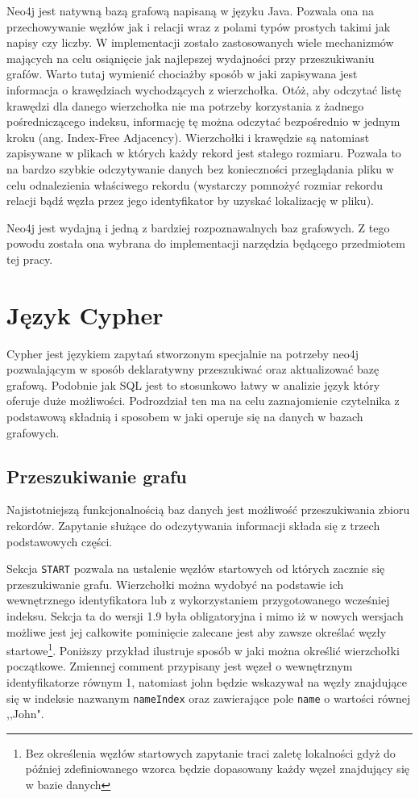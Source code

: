 \documentclass[brudnopis]{xmgr}
\begin{document}
Neo4j jest natywną bazą grafową napisaną w języku Java. Pozwala ona na przechowywanie węzłów jak i relacji wraz z polami typów prostych takimi jak napisy czy liczby. W implementacji zostało zastosowanych wiele mechanizmów mających na celu osiąnięcie jak najlepszej wydajności przy przeszukiwaniu grafów. Warto tutaj wymienić chociażby sposób w jaki zapisywana jest informacja o krawędziach wychodzących z wierzchołka. Otóż, aby odczytać listę krawędzi dla danego wierzchołka nie ma potrzeby korzystania z żadnego pośredniczącego indeksu, informację tę można odczytać bezpośrednio w jednym kroku (ang. Index-Free Adjacency\cite[s.~5]{Robinson:2013:GD}). Wierzchołki i krawędzie są natomiast zapisywane w plikach w których każdy rekord jest stałego rozmiaru. Pozwala to na bardzo szybkie odczytywanie danych bez konieczności przeglądania pliku w celu odnalezienia właściwego rekordu (wystarczy pomnożyć rozmiar rekordu relacji bądź węzła przez jego identyfikator by uzyskać lokalizację w pliku).

Neo4j jest wydajną i jedną z bardziej rozpoznawalnych baz grafowych. Z tego powodu została ona wybrana do implementacji narzędzia będącego przedmiotem tej pracy.

\section{Język Cypher}
Cypher jest językiem zapytań stworzonym specjalnie na potrzeby neo4j pozwalającym w sposób deklaratywny przeszukiwać oraz aktualizować bazę grafową. Podobnie jak SQL jest to stosunkowo łatwy w analizie język który oferuje duże możliwości. Podrozdział ten ma na celu zaznajomienie czytelnika z podstawową składnią i sposobem w jaki operuje się na danych w bazach grafowych.

\subsection{Przeszukiwanie grafu}

Najistotniejszą funkcjonalnością baz danych jest możliwość przeszukiwania zbioru rekordów. Zapytanie służące do odczytywania informacji składa się z trzech podstawowych części.

Sekcja \texttt{START} pozwala na ustalenie węzłów startowych od których zacznie się przeszukiwanie grafu. Wierzchołki można wydobyć na podstawie ich wewnętrznego identyfikatora lub z wykorzystaniem przygotowanego wcześniej indeksu. Sekcja ta do wersji 1.9 była obligatoryjna i mimo iż w nowych wersjach możliwe jest jej całkowite pominięcie zalecane jest aby zawsze określać węzły startowe\footnote{Bez określenia węzłów startowych zapytanie traci zaletę lokalności gdyż do później zdefiniowanego wzorca będzie dopasowany każdy węzeł znajdujący się w bazie danych}. Poniższy przykład ilustruje sposób w jaki można określić wierzchołki początkowe. Zmiennej comment przypisany jest węzeł o wewnętrznym identyfikatorze równym 1, natomiast john będzie wskazywał na węzły znajdujące się w indeksie nazwanym \texttt{nameIndex} oraz zawierające pole \texttt{name} o wartości równej ,,John".
\end{document}
